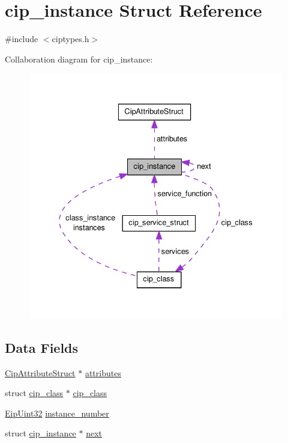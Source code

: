 \hypertarget{structcip__instance}{\section{cip\-\_\-instance \-Struct \-Reference}
\label{d5/dc5/structcip__instance}
}


{\ttfamily \#include $<$ciptypes.\-h$>$}



\-Collaboration diagram for cip\-\_\-instance\-:
\nopagebreak
\begin{figure}[H]
\begin{center}
\leavevmode
\includegraphics[width=335pt]{d9/d0b/structcip__instance__coll__graph}
\end{center}
\end{figure}
\subsection*{\-Data \-Fields}
\begin{DoxyCompactItemize}
\item 
\hyperlink{structCipAttributeStruct}{\-Cip\-Attribute\-Struct} $\ast$ \hyperlink{structcip__instance_ada5c4109b95cb6635f4aa32a2e6d74bf}{attributes}
\item 
struct \hyperlink{structcip__class}{cip\-\_\-class} $\ast$ \hyperlink{structcip__instance_a62fb5c9eb145e33e6435b77734344f1e}{cip\-\_\-class}
\item 
\hyperlink{typedefs_8h_abf2dd49262551294eb990ef8746a2767}{\-Eip\-Uint32} \hyperlink{structcip__instance_ae434a2726f036914d874e3b3b4521221}{instance\-\_\-number}
\item 
struct \hyperlink{structcip__instance}{cip\-\_\-instance} $\ast$ \hyperlink{structcip__instance_a5dd3dc3e7bbdd4643a417edd2aa6e37b}{next}
\end{DoxyCompactItemize}


